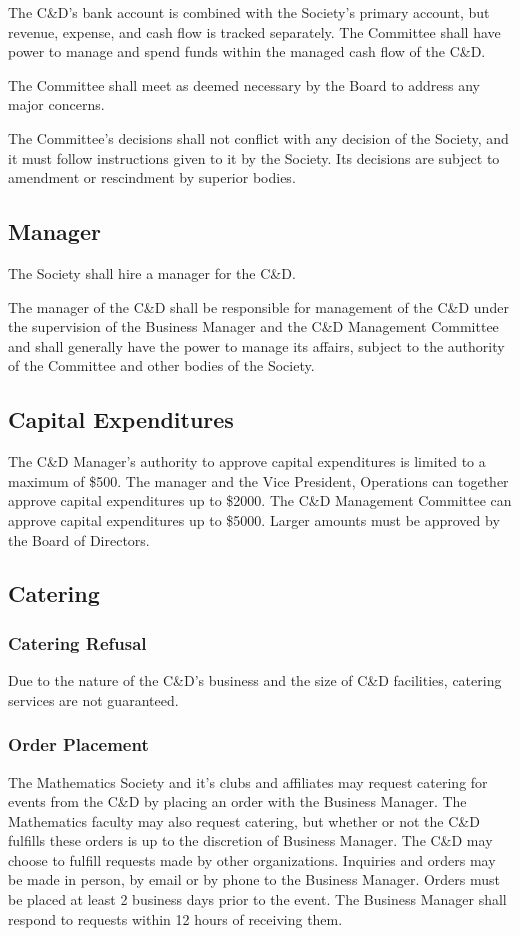 The C\&D's bank account is combined with the Society's primary account,
but revenue, expense, and cash flow is tracked separately. 
The Committee shall have power to manage and spend funds within the managed cash
flow of the C\&D. 

The Committee shall meet as deemed necessary by the Board to 
address any major concerns. 

The Committee's decisions shall not conflict with any decision of the Society,
and it must follow instructions given to it by the Society. Its decisions are
subject to amendment or rescindment by superior bodies.

\subsection{Manager}
The Society shall hire a manager for the C\&D.

The manager of the C\&D shall be responsible for management of the C\&D under
the supervision of the Business Manager and the C\&D Management Committee and
shall generally have the power to manage its affairs, subject to the authority
of the Committee and other bodies of the Society.

\subsection{Capital Expenditures}
The C\&D Manager's authority to approve capital expenditures is limited to
a maximum of \$500. The manager and the Vice President, Operations can together
approve capital expenditures up to \$2000. The C\&D Management Committee can
approve capital expenditures up to \$5000. Larger amounts must be approved by
the Board of Directors.

\subsection{Catering}

\subsubsection{Catering Refusal}
Due to the nature of the C\&D's business and the size of C\&D facilities, catering services are not guaranteed.

\subsubsection{Order Placement}
The Mathematics Society and it's clubs and affiliates may request catering for events from the C\&D by placing an order with the Business Manager. 
The Mathematics faculty may also request catering, but whether or not the C\&D fulfills these orders is up to the discretion of Business Manager. 
The C\&D may choose to fulfill requests made by other organizations.
Inquiries and orders may be made in person, by email or by phone to the Business Manager.
Orders must be placed at least 2 business days prior to the event.
The Business Manager shall respond to requests within 12 hours of receiving them.

